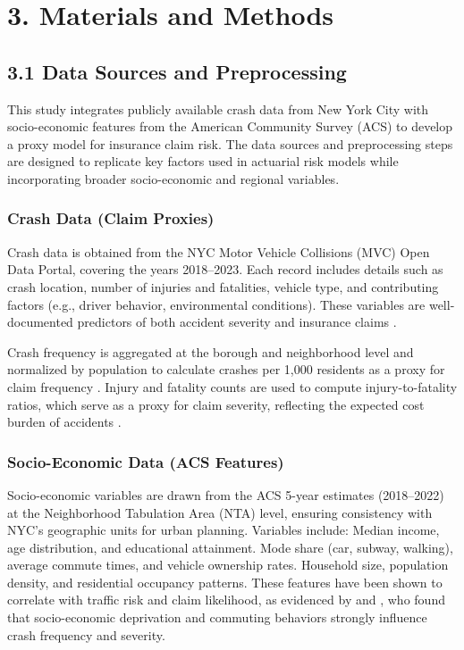 \documentclass[
  number,
  review,
  3p]{elsarticle}
\begin{document}
\section{3. Materials and Methods}\label{materials-and-methods}

\subsection{\texorpdfstring{\textbf{3.1 Data Sources and
Preprocessing}}{3.1 Data Sources and Preprocessing}}\label{data-sources-and-preprocessing}

This study integrates publicly available crash data from New York City
with socio-economic features from the American Community Survey (ACS) to
develop a proxy model for insurance claim risk. The data sources and
preprocessing steps are designed to replicate key factors used in
actuarial risk models while incorporating broader socio-economic and
regional variables.

\subsubsection{\texorpdfstring{\textbf{Crash Data (Claim
Proxies)}}{Crash Data (Claim Proxies)}}\label{crash-data-claim-proxies}

Crash data is obtained from the NYC Motor Vehicle Collisions (MVC) Open
Data Portal, covering the years 2018--2023. Each record includes details
such as crash location, number of injuries and fatalities, vehicle type,
and contributing factors (e.g., driver behavior, environmental
conditions). These variables are well-documented predictors of both
accident severity and insurance claims \citep{adeniyi, dong}.

Crash frequency is aggregated at the borough and neighborhood level and
normalized by population to calculate crashes per 1,000 residents as a
proxy for claim frequency \citep{brubacher}. Injury and fatality counts
are used to compute injury-to-fatality ratios, which serve as a proxy
for claim severity, reflecting the expected cost burden of accidents
\citep{clemente}.

\subsubsection{\texorpdfstring{\textbf{Socio-Economic Data (ACS
Features)}}{Socio-Economic Data (ACS Features)}}\label{socio-economic-data-acs-features}

Socio-economic variables are drawn from the ACS 5-year estimates
(2018--2022) at the Neighborhood Tabulation Area (NTA) level, ensuring
consistency with NYC's geographic units for urban planning. Variables
include: Median income, age distribution, and educational attainment.
Mode share (car, subway, walking), average commute times, and vehicle
ownership rates. Household size, population density, and residential
occupancy patterns. These features have been shown to correlate with
traffic risk and claim likelihood, as evidenced by \citet{brubacher} and
\citet{cabrera}, who found that socio-economic deprivation and commuting
behaviors strongly influence crash frequency and severity.
\end{document}
